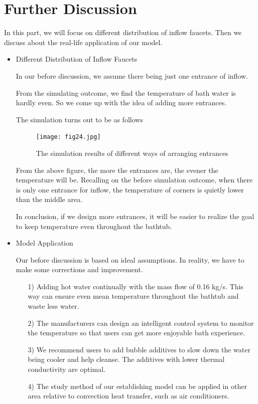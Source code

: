 \documentclass{mcmthesis}
\begin{document}
\section{Further Discussion}

In this part, we will focus on different distribution of inflow faucets. Then we discuss about the real-life application of our model.

\begin{itemize}
\item Different Distribution of Inflow Faucets

In our before discussion, we assume there being just one entrance of inflow.

From the simulating outcome, we find the temperature of bath water is hardly even. So we come up with the idea of adding more entrances.

The simulation turns out to be as follows

\begin{figure}[h] 
\centering
\texttt{[image: fig24.jpg]}
\caption{The simulation results of different ways of arranging entrances} \label{fig24}
\end{figure}

From the above figure, the more the entrances are, the evener the temperature will be. Recalling on the before simulation outcome, when there is only one entrance for inflow, the temperature of corners is quietly lower than the middle area.

In conclusion, if we design more entrances, it will be easier to realize the goal to keep temperature even throughout the bathtub.

\item Model Application

Our before discussion is based on ideal assumptions. In reality, we have to make some corrections and improvement.

\begin{itemize}
\item[1)] Adding hot water continually with the mass flow of 0.16 kg/s. This way can ensure even mean temperature throughout the bathtub and waste less water.

\item[2)] The manufacturers can design an intelligent control system to monitor the temperature so that users can get more enjoyable bath experience.

\item[3)] We recommend users to add bubble additives to slow down the water being cooler and help cleanse. The additives with lower thermal conductivity are optimal.

\item[4)] The study method of our establishing model can be applied in other area relative to convection heat transfer, such as air conditioners.
\end{itemize}
\end{itemize}
\end{document}
